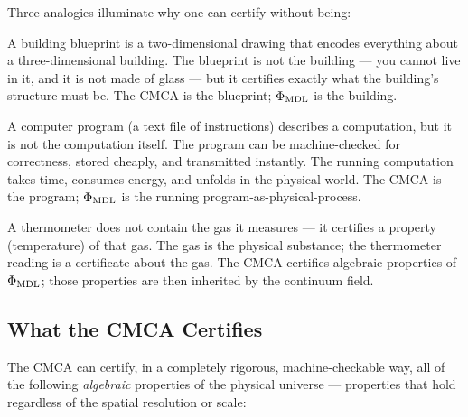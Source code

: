 \documentclass[11pt,a4paper]{article}
\newcommand{\PhiMDL}{\Phi_{\rm MDL}}
\theoremstyle{definition}
\begin{document}
\bigskip
Three analogies illuminate why one can certify without being:

\begin{description}[leftmargin=1.5cm]
  \item[The blueprint analogy.]
    A building blueprint is a two-dimensional drawing that encodes everything about
    a three-dimensional building.  The blueprint is not the building --- you cannot
    live in it, and it is not made of glass --- but it certifies exactly what the
    building's structure must be.  The CMCA is the blueprint; $\PhiMDL$ is the building.

  \item[The program analogy.]
    A computer program (a text file of instructions) describes a computation, but
    it is not the computation itself.  The program can be machine-checked for
    correctness, stored cheaply, and transmitted instantly.  The running computation
    takes time, consumes energy, and unfolds in the physical world.  The CMCA is the
    program; $\PhiMDL$ is the running program-as-physical-process.

  \item[The thermometer analogy.]
    A thermometer does not contain the gas it measures --- it certifies a property
    (temperature) of that gas.  The gas is the physical substance; the thermometer
    reading is a certificate about the gas.  The CMCA certifies algebraic properties
    of $\PhiMDL$; those properties are then inherited by the continuum field.
\end{description}

\subsection{What the CMCA Certifies}

The CMCA can certify, in a completely rigorous, machine-checkable way, all of the
following \emph{algebraic} properties of the physical universe --- properties that hold
regardless of the spatial resolution or scale:
\end{document}
